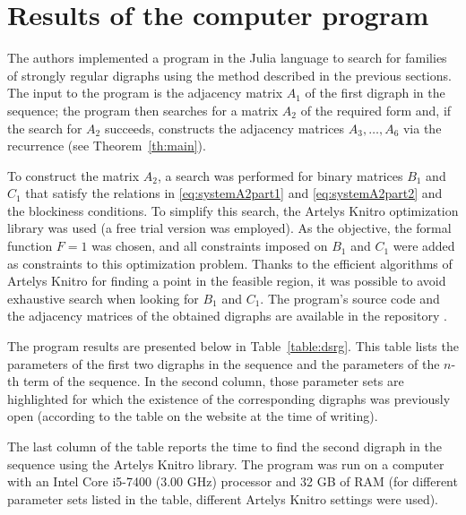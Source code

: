 \documentclass{article}
\begin{document}
\section{Results of the computer program}
\label{sec3}

The authors implemented a program in the Julia language to search for families of strongly regular digraphs using the method described in the previous sections. The input to the program is the adjacency matrix $A_1$ of the first digraph in the sequence; the program then searches for a matrix $A_2$ of the required form and, if the search for $A_2$ succeeds, constructs the adjacency matrices $A_3, \ldots, A_6$ via the recurrence (see Theorem~\ref{th:main}).

To construct the matrix $A_2$, a search was performed for binary matrices $B_1$ and $C_1$ that satisfy the relations in \eqref{eq:systemA2part1} and \eqref{eq:systemA2part2} and the blockiness conditions. To simplify this search, the Artelys Knitro optimization library was used \cite{bibKnitro1} (a free trial version was employed). As the objective, the formal function $F=1$ was chosen, and all constraints imposed on $B_1$ and $C_1$ were added as constraints to this optimization problem. Thanks to the efficient algorithms of Artelys Knitro for finding a point in the feasible region, it was possible to avoid exhaustive search when looking for $B_1$ and $C_1$. The program’s source code and the adjacency matrices of the obtained digraphs are available in the repository \cite{bibGit1}.

The program results are presented below in Table~\ref{table:dsrg}. This table lists the parameters of the first two digraphs in the sequence and the parameters of the $n$-th term of the sequence. In the second column, those parameter sets are highlighted for which the existence of the corresponding digraphs was previously open (according to the table on the website \cite{bibBrouwer1} at the time of writing).

The last column of the table reports the time to find the second digraph in the sequence using the Artelys Knitro library. The program was run on a computer with an Intel Core i5-7400 (3.00 GHz) processor and 32 GB of RAM (for different parameter sets listed in the table, different Artelys Knitro settings were used).
\end{document}
